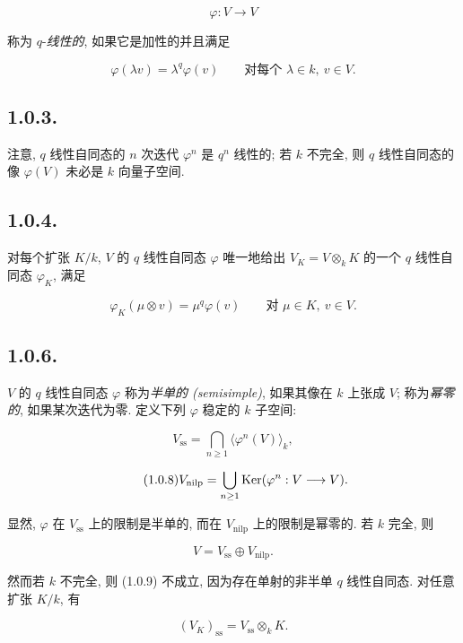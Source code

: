 \begin{equation}\tag{1.0.1}
\varphi:V\longrightarrow V
\end{equation}

称为 $q$-\emph{线性的}, 如果它是加性的并且满足

\begin{equation}\tag{1.0.2}
\varphi(\lambda v)=\lambda^q\varphi(v)
\qquad\text{对每个 }\lambda\in k,\ v\in V.
\end{equation}

\subsection*{1.0.3.}
注意, $q$ 线性自同态的 $n$ 次迭代 $\varphi^n$ 是 $q^n$ 线性的;
若 $k$ 不完全, 则 $q$ 线性自同态的像 $\varphi(V)$ 未必是 $k$ 向量子空间.

\subsection*{1.0.4.}
对每个扩张 $K/k$, $V$ 的 $q$ 线性自同态 $\varphi$ 唯一地给出
$V_K=V\otimes_kK$ 的一个 $q$ 线性自同态 $\varphi_K$, 满足

\begin{equation}\tag{1.0.5}
\varphi_K(\mu\otimes v)=\mu^q\varphi(v)
\qquad\text{对 }\mu\in K,\ v\in V.
\end{equation}

\subsection*{1.0.6.}
$V$ 的 $q$ 线性自同态 $\varphi$ 称为\emph{半单的 (semisimple)},
如果其像在 $k$ 上张成 $V$; 称为\emph{幂零的}, 如果某次迭代为零.
定义下列 $\varphi$ 稳定的 $k$ 子空间:

\begin{equation}\tag{1.0.7}
V_{\mathrm{ss}}=
\bigcap_{n\geq1}\langle\varphi^n(V)\rangle_k,
\end{equation}

\begin{equation}\tag{1.0.8}
V_{\mathrm{nilp}}=
\bigcup_{n\geq1}\operatorname{Ker}(\varphi^n:V\longrightarrow V).
\end{equation}

显然, $\varphi$ 在 $V_{\mathrm{ss}}$ 上的限制是半单的,
而在 $V_{\mathrm{nilp}}$ 上的限制是幂零的. 若 $k$ 完全, 则

\begin{equation}\tag{1.0.9}
V=V_{\mathrm{ss}}\oplus V_{\mathrm{nilp}}.
\end{equation}

然而若 $k$ 不完全, 则 (1.0.9) 不成立, 因为存在单射的非半单 $q$ 线性自同态.
对任意扩张 $K/k$, 有

\begin{equation}\tag{1.0.10}
(V_K)_{\mathrm{ss}}=V_{\mathrm{ss}}\otimes_kK.
\end{equation}

